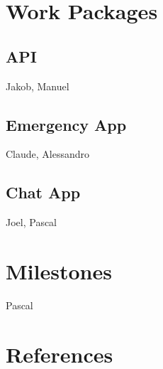 \documentclass{report}
\begin{document}
	\section{Work Packages}
	
		\subsection{API}
			Jakob, Manuel
		
		\subsection{Emergency App}
			Claude, Alessandro
		
		\subsection{Chat App}
			Joel, Pascal
	
	\section{Milestones}
		Pascal
	
	\section{References}
	
	
	
	
\end{document}
